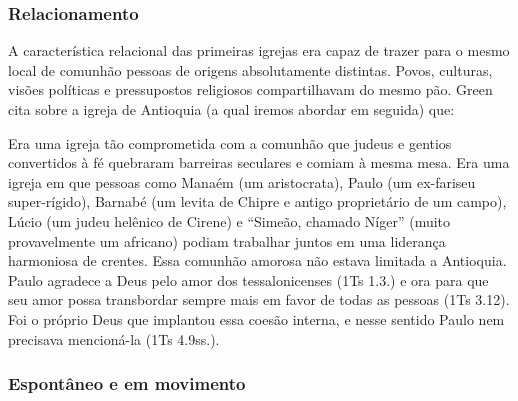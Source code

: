 \documentclass[
	12pt,				%
	openright,			%
	twoside,			%
	a4paper,			%
	english,			%
	french,				%
	spanish,			%
	brazil				%
	]{abntex2}
\begin{document}
{\subsubsection{Relacionamento}

A característica relacional das primeiras igrejas era capaz de trazer para o mesmo local de comunhão pessoas de origens absolutamente distintas. Povos, culturas, visões políticas e pressupostos religiosos compartilhavam do mesmo pão. Green cita sobre a igreja de Antioquia (a qual iremos abordar em seguida) que:

\begin{citacao}
Era uma igreja tão comprometida com a comunhão que judeus e gentios convertidos à fé quebraram barreiras seculares e comiam à mesma mesa. Era uma igreja em que pessoas como Manaém (um aristocrata), Paulo (um ex-fariseu super-rígido), Barnabé (um levita de Chipre e antigo proprietário de um campo), Lúcio (um judeu helênico de Cirene) e “Simeão, chamado Níger” (muito provavelmente um africano)
podiam trabalhar juntos em uma liderança harmoniosa de crentes. Essa comunhão amorosa não estava limitada a Antioquia. Paulo agradece a Deus pelo amor dos tessalonicenses (1Ts 1.3.) e ora para que seu amor possa transbordar sempre mais em favor de todas as pessoas (1Ts 3.12). Foi o próprio Deus que
implantou essa coesão interna, e nesse sentido Paulo nem precisava mencioná-la (1Ts 4.9ss.).
\end{citacao}\cite[261]{green}


\subsubsection{Espontâneo e em movimento}

}
\end{document}

